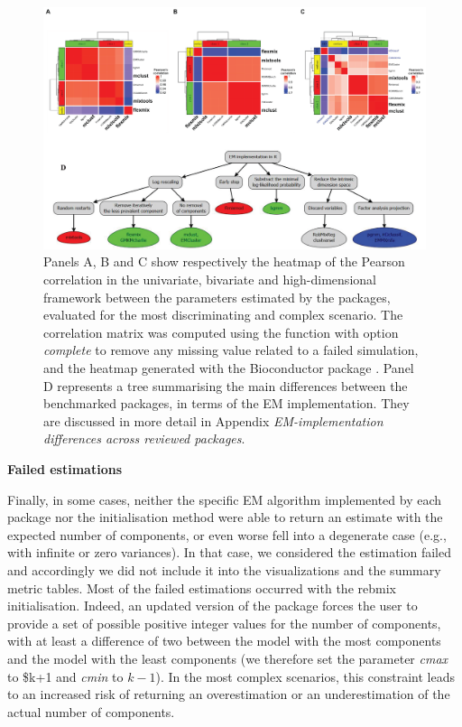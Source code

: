 \begin{figure}

{\centering \includegraphics[width=1\linewidth]{./figs/dichotomy_package_conclusion} 

}

\caption{Panels A, B and C show respectively the heatmap of the Pearson correlation in the univariate, bivariate and high-dimensional framework between the parameters estimated by the packages, evaluated for the most discriminating and complex scenario. The correlation matrix was computed using the function  with option \textit{complete} to remove any missing value related to a failed simulation, and the heatmap generated with the Bioconductor package . Panel D represents a tree summarising the main differences between the benchmarked packages, in terms of the EM implementation. They are discussed in more detail in Appendix \textit{EM-implementation differences across reviewed packages}.}\label{fig:dichotomy-package-conclusion}
\end{figure}

\textbf{Failed estimations}

Finally, in some cases, neither the specific EM algorithm implemented by each package nor the initialisation method were able to return an estimate with the expected number of components, or even worse fell into a degenerate case (e.g., with infinite or zero variances). In that case, we considered the estimation failed and accordingly we did not include it into the visualizations and the summary metric tables. Most of the failed estimations occurred with the rebmix initialisation. Indeed, an updated version of the package forces the user to provide a set of possible positive integer values for the number of components, with at least a difference of two between the model with the most components and the model with the least components (we therefore set the parameter \emph{cmax} to \$k+1 and \emph{cmin} to \(k-1\)). In the most complex scenarios, this constraint leads to an increased risk of returning an overestimation or an underestimation of the actual number of components.

